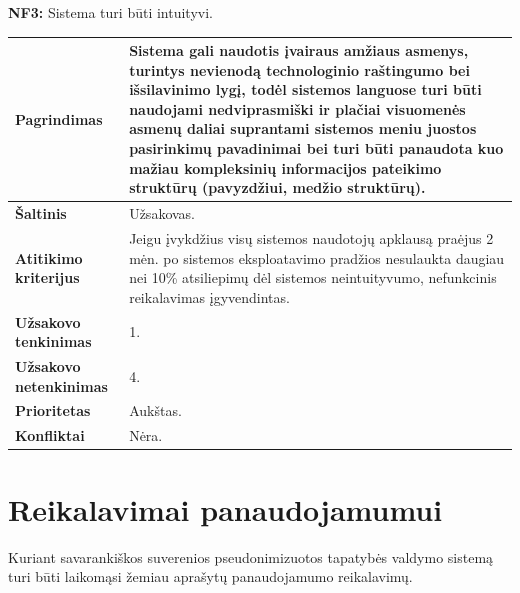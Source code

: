 \documentclass[12pt]{article}
\begin{document}
\noindent \textbf{NF3:} Sistema turi būti intuityvi.
\label{sec:NF3}
\begin{table}[htb!]
    \captionsetup{justification=centering}
    \begin{tabular}{|m{4.9cm}|m{11cm}|}
        \hline
        \raggedleft \textbf{\cellcolor{deepchampagne}Pagrindimas} &
        Sistema gali naudotis įvairaus amžiaus asmenys, turintys nevienodą
        technologinio raštingumo bei išsilavinimo lygį, todėl sistemos languose
        turi būti naudojami nedviprasmiški ir plačiai visuomenės asmenų daliai
        suprantami sistemos meniu juostos pasirinkimų pavadinimai bei turi būti
        panaudota kuo mažiau kompleksinių informacijos pateikimo struktūrų
        (pavyzdžiui, medžio struktūrų). \\
        \hline
        \raggedleft \textbf{\cellcolor{deepchampagne}Šaltinis} & Užsakovas. \\
        \hline
        \raggedleft \textbf{\cellcolor{deepchampagne}Atitikimo kriterijus} & 
        Jeigu įvykdžius visų sistemos naudotojų apklausą praėjus 2 mėn. po
        sistemos eksploatavimo pradžios nesulaukta daugiau
        nei 10\% atsiliepimų dėl sistemos neintuityvumo, nefunkcinis
        reikalavimas įgyvendintas. \\
        \hline
        \raggedleft \textbf{\cellcolor{deepchampagne}Užsakovo tenkinimas} & 1. \\
        \hline
        \raggedleft \textbf{\cellcolor{deepchampagne}Užsakovo netenkinimas} & 4. \\
        \hline
        \raggedleft \textbf{\cellcolor{deepchampagne}Prioritetas} & Aukštas. \\
        \hline
        \raggedleft \textbf{\cellcolor{deepchampagne}Konfliktai} & Nėra. \\
        \hline
    \end{tabular}
\end{table}

\newpage

\section{Reikalavimai panaudojamumui}
Kuriant savarankiškos suverenios pseudonimizuotos tapatybės valdymo sistemą
turi būti laikomąsi žemiau aprašytų panaudojamumo reikalavimų.
\vskip 10pt
\end{document}
